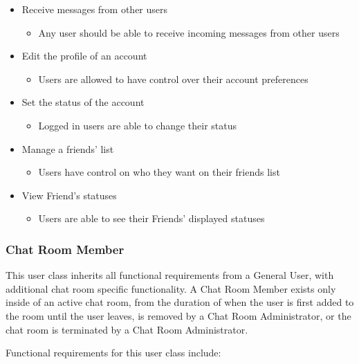 \documentclass[12pt]{article}
\begin{document}
\begin{itemize}
\begin{itemize}
      \end{itemize}
\item Receive messages from other users
     \begin{itemize}
        \item Any user should be able to receive incoming messages from other users
      \end{itemize}
\item Edit the profile of an account 
     \begin{itemize}
        \item Users are allowed to have control over their account preferences
      \end{itemize} 
\item Set the status of the account 
     \begin{itemize}
        \item Logged in users are able to change their status 
      \end{itemize}     
\item Manage a friends' list 
     \begin{itemize}
        \item Users have control on who they want on their friends list
      \end{itemize} 
\item View Friend's statuses 
\begin{itemize}
        \item Users are able to see their Friends’ displayed statuses
      \end{itemize} 

\end{itemize}

\subsubsection{\RaggedRight Chat Room Member} 
This user class inherits all functional requirements from a General User, with additional chat room specific functionality. A Chat Room Member exists only inside of an active chat room, from the duration of when the user is first added to the room until the user leaves, is removed by a Chat Room Administrator, or the chat room is terminated by a Chat Room Administrator.

Functional requirements for this user class include:
\end{document}
